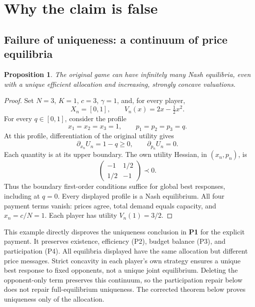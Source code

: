 \documentclass[11pt]{article}
\newtheorem{proposition}[theorem]{Proposition}
\begin{document}
\section{Why the claim is false}
\subsection{Failure of uniqueness: a continuum of price equilibria}
\begin{proposition}\label{nonunique}
The original game can have infinitely many Nash equilibria, even with
a unique efficient allocation and increasing, strongly concave valuations.
\end{proposition}
\begin{proof}
Set $N=3$, $K=1$, $c=3$, $\gamma=1$, and, for every player,
\[
 X_n=[0,1],\qquad V_n(x)=2x-\tfrac12x^2.
\]
For every $q\in[0,1]$, consider the profile
\[
 x_1=x_2=x_3=1,\qquad p_1=p_2=p_3=q.
\]
At this profile, differentiation of the original utility gives
\[
 \partial_{x_n}U_n=1-q\ge0,\qquad
 \partial_{p_n}U_n=0.
\]
Each quantity is at its upper boundary. The own utility Hessian,
in $(x_n,p_n)$, is
\[
 \begin{pmatrix}-1&1/2\\1/2&-1\end{pmatrix}\prec0.
\]
Thus the boundary first-order conditions suffice for global best
responses, including at $q=0$. Every displayed profile is a Nash
equilibrium. All four payment terms vanish: prices agree, total
demand equals capacity, and $x_n=c/N=1$. Each player has utility
$V_n(1)=3/2$.
\end{proof}

This example directly disproves the uniqueness conclusion in
\textbf{P1} for the explicit payment. It preserves existence,
efficiency (P2), budget balance (P3), and participation (P4).
All equilibria displayed have the same allocation but different price
messages. Strict concavity in each player's own strategy ensures a
unique best response to fixed opponents, not a unique joint equilibrium.
Deleting the opponent-only term preserves this continuum, so the
participation repair below does not repair full-equilibrium uniqueness.
The corrected theorem below proves uniqueness only of the allocation.
\end{document}
